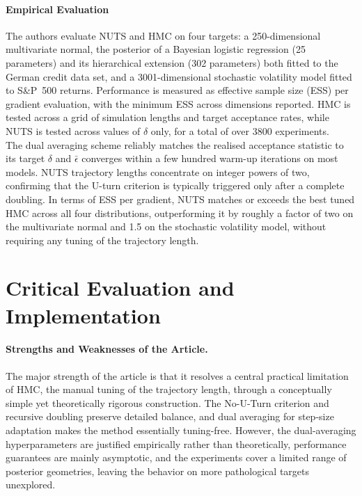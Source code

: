 \documentclass{article}
\begin{document}
\paragraph{Empirical Evaluation}
The authors evaluate NUTS and HMC on four targets: a 250-dimensional multivariate normal, the posterior of a Bayesian logistic regression (25 parameters) and its hierarchical extension (302 parameters) both fitted to the German credit data set, and a 3001-dimensional stochastic volatility model fitted to S\&P~500 returns. Performance is measured as effective sample size (ESS) per gradient evaluation, with the minimum ESS across dimensions reported. HMC is tested across a grid of simulation lengths and target acceptance rates, while NUTS is tested across values of $\delta$ only, for a total of over 3800 experiments. \\
The dual averaging scheme reliably matches the realised acceptance statistic to its target $\delta$ and $\bar{\epsilon}$ converges within a few hundred warm-up iterations on most models. NUTS trajectory lengths concentrate on integer powers of two, confirming that the U-turn criterion is typically triggered only after a complete doubling. In terms of ESS per gradient, NUTS matches or exceeds the best tuned HMC across all four distributions, outperforming it by roughly a factor of two on the multivariate normal and 1.5 on the stochastic volatility model, without requiring any tuning of the trajectory length.


\section{Critical Evaluation and Implementation}

\paragraph{Strengths and Weaknesses of the Article.}
The major strength of the article is that it resolves a central practical limitation of HMC, the manual tuning of the trajectory length, through a conceptually simple yet theoretically rigorous construction. The No-U-Turn criterion and recursive doubling preserve detailed balance, and dual averaging for step-size adaptation makes the method essentially tuning-free. However, the dual-averaging hyperparameters are justified empirically rather than theoretically, performance guarantees are mainly asymptotic, and the experiments cover a limited range of posterior geometries, leaving the behavior on more pathological targets unexplored.
\end{document}
